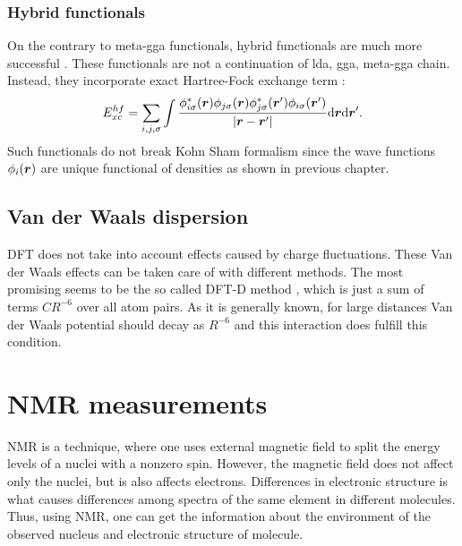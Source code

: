 \documentclass[openany, longbibliography,slovene,a4paper,12pt]{article}
\def\vec#1{\mbox{\boldmath$#1$}}
\newcommand{\dif}{\mathrm{d}}
\begin{document}
\subsubsection{Hybrid functionals}
On the contrary to meta-gga functionals, hybrid functionals are much more
successful \cite{challenges_den_fun_theor}. These functionals are not a
continuation of lda, gga, meta-gga chain. Instead, they incorporate exact
Hartree-Fock exchange term \cite{challenges_den_fun_theor}:
\begin{equation}
  E^{hf}_{xc}=\sum_ {i,j,\sigma}\int\frac{\phi^*_{i\sigma}(\vec r) \phi_{j\sigma}(\vec r) \phi^*_{j\sigma}(\vec r') \phi_{i\sigma}(\vec r')}{|\vec r - \vec r'|}\dif \vec r \dif \vec r'.
\end{equation}
Such functionals do not break Kohn Sham formalism since the wave functions
$\phi_i(\vec r)$ are unique functional of densities as shown in previous
chapter.

\subsection{Van der Waals dispersion}
DFT does not take into account effects caused by charge fluctuations. These Van
der Waals effects can be taken care of with different methods.
 The most promising seems to be the so called DFT-D method
\cite{consis_accur_ab_initio_param}, which is just a sum of terms $CR^{-6}$
over all atom pairs. As it is generally known, for large distances Van der Waals
potential should decay as $R^{-6}$ and this interaction does fulfill this
condition.


\section{NMR measurements}
NMR is a technique, where one uses external magnetic field to split the energy levels of
a nuclei with a nonzero spin. However, the magnetic field does not affect only
the nuclei, but is also affects electrons. Differences in electronic structure is
what causes differences among spectra of the same element in different molecules.
Thus, using NMR, one can get the information about the environment of the
observed nucleus and electronic structure of molecule.
\end{document}
